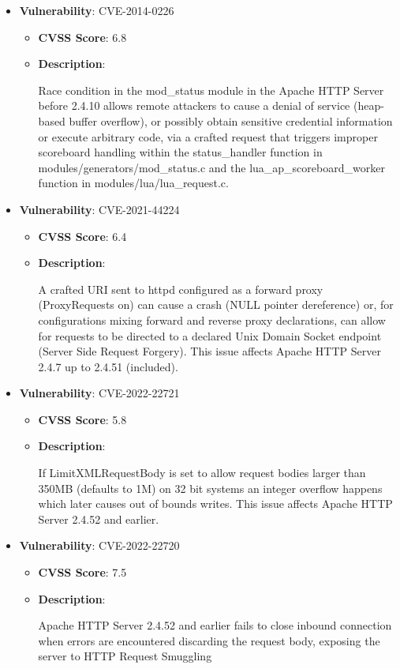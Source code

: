 \documentclass{article}
\begin{document}
\begin{itemize}
        \item \textbf{Vulnerability}: CVE-2014-0226
        \begin{itemize}
            \item \textbf{CVSS Score}:  6.8 
            \item \textbf{Description}:
            \parbox[t]{0.9\linewidth}{
                \ttfamily Race condition in the mod\_status module in the Apache HTTP Server before 2.4.10 allows remote attackers to cause a denial of service (heap-based buffer overflow), or possibly obtain sensitive credential information or execute arbitrary code, via a crafted request that triggers improper scoreboard handling within the status\_handler function in modules/generators/mod\_status.c and the lua\_ap\_scoreboard\_worker function in modules/lua/lua\_request.c.
            }
        \end{itemize}
    
        \item \textbf{Vulnerability}: CVE-2021-44224
        \begin{itemize}
            \item \textbf{CVSS Score}:  6.4 
            \item \textbf{Description}:
            \parbox[t]{0.9\linewidth}{
                \ttfamily A crafted URI sent to httpd configured as a forward proxy (ProxyRequests on) can cause a crash (NULL pointer dereference) or, for configurations mixing forward and reverse proxy declarations, can allow for requests to be directed to a declared Unix Domain Socket endpoint (Server Side Request Forgery). This issue affects Apache HTTP Server 2.4.7 up to 2.4.51 (included).
            }
        \end{itemize}
    
        \item \textbf{Vulnerability}: CVE-2022-22721
        \begin{itemize}
            \item \textbf{CVSS Score}:  5.8 
            \item \textbf{Description}:
            \parbox[t]{0.9\linewidth}{
                \ttfamily If LimitXMLRequestBody is set to allow request bodies larger than 350MB (defaults to 1M) on 32 bit systems an integer overflow happens which later causes out of bounds writes. This issue affects Apache HTTP Server 2.4.52 and earlier.
            }
        \end{itemize}
    
        \item \textbf{Vulnerability}: CVE-2022-22720
        \begin{itemize}
            \item \textbf{CVSS Score}:  7.5 
            \item \textbf{Description}:
            \parbox[t]{0.9\linewidth}{
                \ttfamily Apache HTTP Server 2.4.52 and earlier fails to close inbound connection when errors are encountered discarding the request body, exposing the server to HTTP Request Smuggling
            }
        \end{itemize}
    

\end{itemize}
\end{document}
